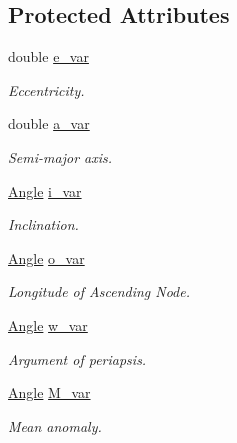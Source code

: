 \subsection*{Protected Attributes}
\begin{DoxyCompactItemize}
\item 
\hypertarget{class_orbit3_d_a573611da3b62dd90339c6c09dbafe881}{double \hyperlink{class_orbit3_d_a573611da3b62dd90339c6c09dbafe881}{e\+\_\+var}}\label{class_orbit3_d_a573611da3b62dd90339c6c09dbafe881}

\begin{DoxyCompactList}\small\item\em Eccentricity. \end{DoxyCompactList}\item 
\hypertarget{class_orbit3_d_aae4380c7fec444703aae70199537e6ad}{double \hyperlink{class_orbit3_d_aae4380c7fec444703aae70199537e6ad}{a\+\_\+var}}\label{class_orbit3_d_aae4380c7fec444703aae70199537e6ad}

\begin{DoxyCompactList}\small\item\em Semi-\/major axis. \end{DoxyCompactList}\item 
\hypertarget{class_orbit3_d_a31eb6dd2995ec28130e04f01e8fa7085}{\hyperlink{class_angle}{Angle} \hyperlink{class_orbit3_d_a31eb6dd2995ec28130e04f01e8fa7085}{i\+\_\+var}}\label{class_orbit3_d_a31eb6dd2995ec28130e04f01e8fa7085}

\begin{DoxyCompactList}\small\item\em Inclination. \end{DoxyCompactList}\item 
\hypertarget{class_orbit3_d_a28391400bb3ad7f2ec5eb85edfa2eeb0}{\hyperlink{class_angle}{Angle} \hyperlink{class_orbit3_d_a28391400bb3ad7f2ec5eb85edfa2eeb0}{o\+\_\+var}}\label{class_orbit3_d_a28391400bb3ad7f2ec5eb85edfa2eeb0}

\begin{DoxyCompactList}\small\item\em Longitude of Ascending Node. \end{DoxyCompactList}\item 
\hypertarget{class_orbit3_d_a15c064c8739446d98728744405b0da63}{\hyperlink{class_angle}{Angle} \hyperlink{class_orbit3_d_a15c064c8739446d98728744405b0da63}{w\+\_\+var}}\label{class_orbit3_d_a15c064c8739446d98728744405b0da63}

\begin{DoxyCompactList}\small\item\em Argument of periapsis. \end{DoxyCompactList}\item 
\hypertarget{class_orbit3_d_a37deb92c6212b9452a4ade9d8faeb133}{\hyperlink{class_angle}{Angle} \hyperlink{class_orbit3_d_a37deb92c6212b9452a4ade9d8faeb133}{M\+\_\+var}}\label{class_orbit3_d_a37deb92c6212b9452a4ade9d8faeb133}

\begin{DoxyCompactList}\small\item\em Mean anomaly. \end{DoxyCompactList}\end{DoxyCompactItemize}


